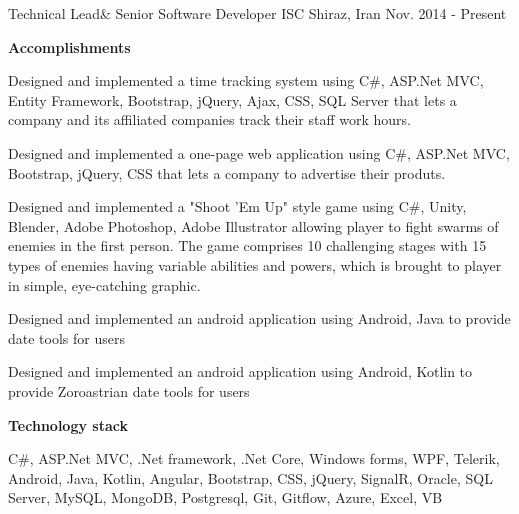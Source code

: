 


\begin{cventries}


\cventry
{Technical Lead\& Senior Software Developer} %
{ISC} %
{Shiraz, Iran} %
{Nov. 2014 - Present} %
{}

\cventry
{\textbf{Accomplishments}} %
{} %
{} %
{} %
{ %
\begin{cvitems}
\item {Designed and implemented a time tracking system using C\#, ASP.Net MVC, Entity Framework, Bootstrap, jQuery, Ajax, CSS, SQL Server that lets a company and its affiliated companies track their staff work hours.}
\item {Designed and implemented a one-page web application using C\#, ASP.Net MVC, Bootstrap, jQuery, CSS that lets a company to advertise their produts.}
\item {Designed and implemented a "Shoot 'Em Up" style game using C\#, Unity, Blender, Adobe Photoshop, Adobe Illustrator allowing player to fight swarms of enemies in the first person. The game comprises 10 challenging stages with 15 types of enemies having variable abilities and powers, which is brought to player in simple, eye-catching graphic.}
\item {Designed and implemented an android application using Android, Java to provide date tools for users}
\item {Designed and implemented an android application using Android, Kotlin to provide Zoroastrian date tools for users}
\end{cvitems}
}

\cventry
{\textbf{Technology stack}} %
{} %
{} %
{} %
{ %
\begin{cvitems}
\item {
C\#, ASP.Net MVC, .Net framework, .Net Core, Windows forms, WPF, Telerik, Android, Java, Kotlin, Angular, Bootstrap,
 CSS, jQuery, SignalR, Oracle, SQL Server, MySQL, MongoDB, Postgresql, Git, Gitflow, Azure, Excel, VB
}
\end{cvitems}
}


\end{cventries}